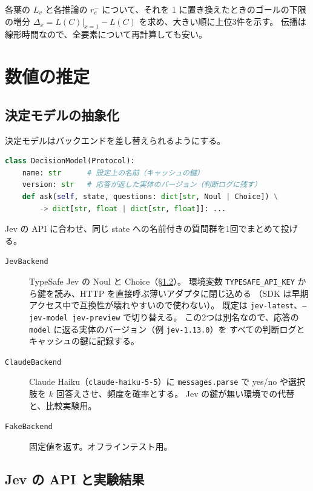 \documentclass[a4paper,11pt]{ltjsarticle}
\begin{document}
各葉の $L_v$ と各推論の $r_e^-$ について、それを 1 に置き換えたときのゴールの下限の増分
$\Delta_x = L(C)\big|_{x=1} - L(C)$ を求め、大きい順に上位3件を示す。
伝播は線形時間なので、全要素について再計算しても安い。

\section{数値の推定}

\subsection{決定モデルの抽象化}

決定モデルはバックエンドを差し替えられるようにする。
\begin{lstlisting}[language=Python]
class DecisionModel(Protocol):
    name: str      # 設定上の名前（キャッシュの鍵）
    version: str   # 応答が返した実体のバージョン（判断ログに残す）
    def ask(self, state, questions: dict[str, Noul | Choice]) \
        -> dict[str, float | dict[str, float]]: ...
\end{lstlisting}
Jev の API に合わせ、同じ state への名前付きの質問群を1回でまとめて投げる。

\begin{description}
  \item[\texttt{JevBackend}] TypeSafe Jev の Noul と Choice（§\ref{sec:jevspec}）。
        環境変数 \texttt{TYPESAFE\_API\_KEY} から鍵を読み、HTTP を直接呼ぶ薄いアダプタに閉じ込める
        （SDK は早期アクセス中で互換性が壊れやすいので使わない）。
        既定は \texttt{jev-latest}、\texttt{--jev-model jev-preview} で切り替える。
        この2つは別名なので、応答の \texttt{model} に返る実体のバージョン（例 \texttt{jev-1.13.0}）を
        すべての判断ログとキャッシュの鍵に記録する。
  \item[\texttt{ClaudeBackend}] Claude Haiku（\texttt{claude-haiku-5-5}）に
        \texttt{messages.parse} で yes/no や選択肢を $k$ 回答えさせ、頻度を確率とする。
        Jev の鍵が無い環境での代替と、比較実験用。
  \item[\texttt{FakeBackend}] 固定値を返す。オフラインテスト用。
\end{description}

\subsection{Jev の API と実験結果}\label{sec:jevspec}
\end{document}
